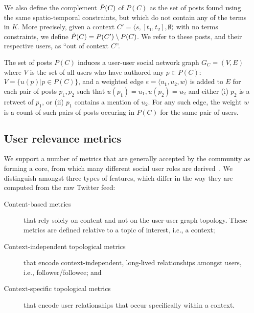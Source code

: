 \documentclass[runningheads]{llncs}
\begin{document}
We also define the complement $\Tilde{P}(C)$ of $P(C)$ as the set of posts found using the same spatio-temporal constraints, but which do not contain any of the terms in $K$. More precisely, given a context $C'= \langle s, [t_1, t_2], \emptyset \rangle$ with no terms constraints, we define $\Tilde{P}(C) = P(C') \setminus P(C)$. 
We refer to these posts, and their respective users, as ``out of context $C$''.

The set of posts $P(C)$ induces a user-user social network graph $G_C = (V,E)$ where $V$ is the set of all users who have authored any $p \in P(C)$: 
$V = \{ u(p) | p \in P(C) \}$, and a weighted edge $e = \langle u_1, u_2, w \rangle$ is added to $E$ for each pair of posts $p_1, p_2$ such that $u(p_1) = u_1, u(p_2) = u_2$ and 
either (i) $p_2$ is a retweet of $p_1$, or (ii) $p_1$ contains a mention of $u_2$.
For any such edge, the weight $w$ is a count of such pairs of posts occuring in $P(C)$ for the same pair of users.

\subsection{User relevance metrics}  \label{sec:metrics}

We support a number of metrics that are generally accepted by the community as forming a core, from which many different social user roles are derived~\cite{RIQUELME2016949}. 
We distinguish amongst three types of features, which differ in the way they are computed from the raw Twitter feed:
\begin{description}
	\item[Content-based metrics] that rely solely on content and not on the user-user graph topology. These metrics are defined relative to a topic of interest, i.e., a context;
	\item[Context-independent topological metrics] that encode context-independent, long-lived relationships amongst users, i.e., follower/followee; and 
	\item[Context-specific topological metrics] that encode user relationships that occur specifically within a context.
\end{description}
\end{document}
